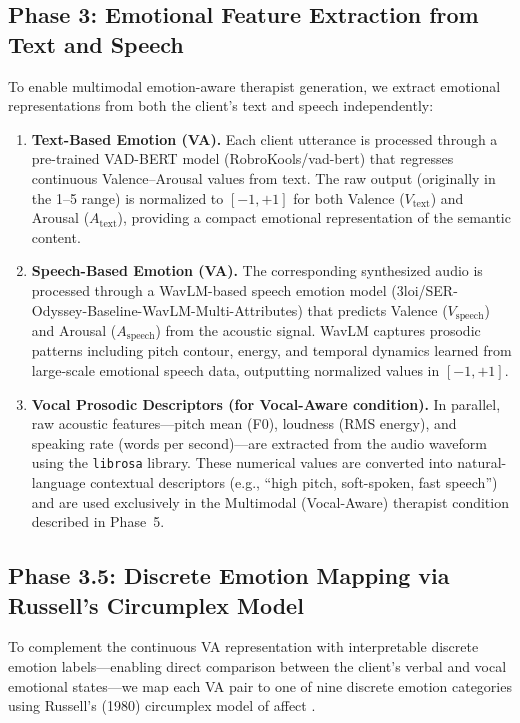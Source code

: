 \subsection{Phase 3: Emotional Feature Extraction from Text and Speech}

To enable multimodal emotion-aware therapist generation, we extract emotional representations from both the client's text and speech independently:

\begin{enumerate}
    \item \textbf{Text-Based Emotion (VA).}
    Each client utterance is processed through a pre-trained VAD-BERT model (RobroKools/vad-bert) that regresses continuous Valence--Arousal values from text. The raw output (originally in the 1--5 range) is normalized to $[-1, +1]$ for both Valence ($V_{\text{text}}$) and Arousal ($A_{\text{text}}$), providing a compact emotional representation of the semantic content.

    \item \textbf{Speech-Based Emotion (VA).}
    The corresponding synthesized audio is processed through a WavLM-based speech emotion model (3loi/SER-Odyssey-Baseline-WavLM-Multi-Attributes) that predicts Valence ($V_{\text{speech}}$) and Arousal ($A_{\text{speech}}$) from the acoustic signal. WavLM captures prosodic patterns including pitch contour, energy, and temporal dynamics learned from large-scale emotional speech data, outputting normalized values in $[-1, +1]$.

    \item \textbf{Vocal Prosodic Descriptors (for Vocal-Aware condition).}
    In parallel, raw acoustic features---pitch mean (F0), loudness (RMS energy), and speaking rate (words per second)---are extracted from the audio waveform using the \texttt{librosa} library. These numerical values are converted into natural-language contextual descriptors (e.g., ``high pitch, soft-spoken, fast speech'') and are used exclusively in the Multimodal (Vocal-Aware) therapist condition described in Phase~5.
\end{enumerate}


\subsection{Phase 3.5: Discrete Emotion Mapping via Russell's Circumplex Model}

To complement the continuous VA representation with interpretable discrete emotion labels---enabling direct comparison between the client's verbal and vocal emotional states---we map each VA pair to one of nine discrete emotion categories using Russell's (1980) circumplex model of affect \cite{russell1980circumplex}.

